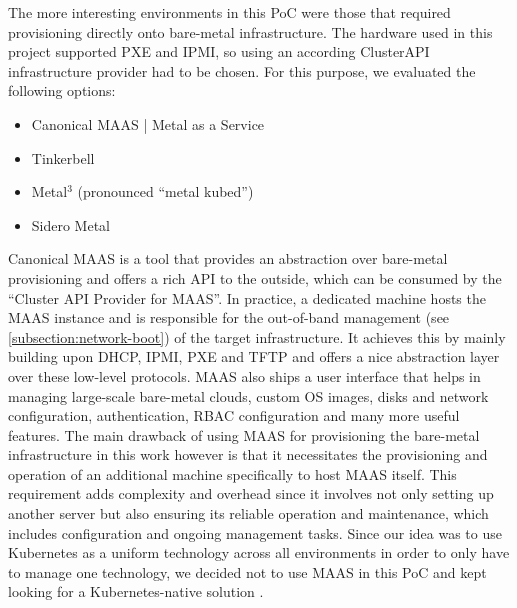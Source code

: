         The more interesting environments in this PoC were those that required provisioning directly onto bare-metal infrastructure. The hardware used in this project supported PXE and IPMI, so using an according ClusterAPI infrastructure provider had to be chosen. For this purpose, we evaluated the following options:

        \begin{itemize}
            \item Canonical MAAS | Metal as a Service
            \item Tinkerbell
            \item Metal$^3$ (pronounced ``metal kubed'')
            \item Sidero Metal
        \end{itemize}

        \noindent Canonical MAAS is a tool that provides an abstraction over bare-metal provisioning and offers a rich API to the outside, which can be consumed by the ``Cluster API Provider for MAAS''. In practice, a dedicated machine hosts the MAAS instance and is responsible for the out-of-band management (see \autoref{subsection:network-boot}) of the target infrastructure. It achieves this by mainly building upon DHCP, IPMI, PXE and TFTP and offers a nice abstraction layer over these low-level protocols. MAAS also ships a user interface that helps in managing large-scale bare-metal clouds, custom OS images, disks and network configuration, authentication, RBAC configuration and many more useful features. The main drawback of using MAAS for provisioning the bare-metal infrastructure in this work however is that it necessitates the provisioning and operation of an additional machine specifically to host MAAS itself. This requirement adds complexity and overhead since it involves not only setting up another server but also ensuring its reliable operation and maintenance, which includes configuration and ongoing management tasks. Since our idea was to use Kubernetes as a uniform technology across all environments in order to only have to manage one technology, we decided not to use MAAS in this PoC and kept looking for a Kubernetes-native solution \cite{canonical_maas}. \newline

